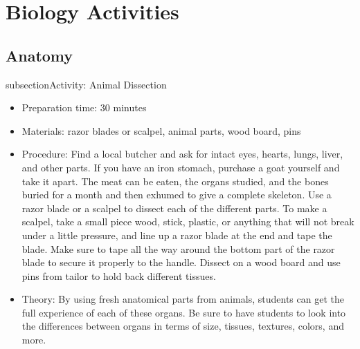 \chapter{Biology Activities}

\section{Anatomy}

subsection{Activity: Animal Dissection}
\begin{itemize}
\item{Preparation time: 30 minutes}
\item{Materials: razor blades or scalpel, animal parts, wood board, pins}
\item{Procedure: Find a local butcher and ask for intact eyes, hearts, lungs, liver, and other parts. If you have an iron stomach, purchase a goat yourself and take it apart. The meat can be eaten, the organs studied, and the bones buried for a month and then exhumed to give a complete skeleton. Use a razor blade or a scalpel to dissect each of the different parts. To make a scalpel, take a small piece wood, stick, plastic, or anything that will not break under a little pressure, and line up a razor blade at the end and tape the blade. Make sure to tape all the way around the bottom part of the razor blade to secure it properly to the handle. Dissect on a wood board and use pins from tailor to hold back different tissues.}
\item{Theory: By using fresh anatomical parts from animals, students can get the full experience of each of these organs. Be sure to have students to look into the differences between organs in terms of size, tissues, textures, colors, and more.}
\end{itemize}

